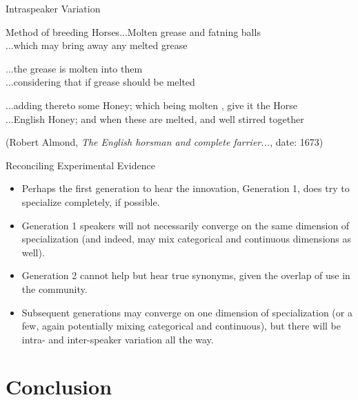 \documentclass[hyperref={pdfpagelabels=false}]{beamer}
\begin{document}
\begin{frame}{Intraspeaker Variation}
		\begin{exe}
			\ex \begin{xlist} \ex Method of breeding Horses...Molten grease and fatning balls\\
			\ex ...which may bring away any melted grease\\
			\end{xlist}
			\ex \begin{xlist} \ex ...the grease is molten into them\\
			\ex ...considering that if grease should be melted\\
			\end{xlist}
			\ex \begin{xlist} \ex...adding thereto some Honey; which being molten , give it the Horse\\
			\ex ...English Honey; and when these are melted, and well stirred together\\
			\end{xlist}
		\end{exe}
		(Robert Almond, \textsl{The English horsman and complete farrier...}, date: 1673)
\end{frame}


\begin{frame}{Reconciling Experimental Evidence}
		\begin{itemize}
			\item Perhaps the first generation to hear the innovation, Generation 1, does try to specialize completely, if possible.
			\item Generation 1 speakers will not necessarily converge on the same dimension of specialization (and indeed, may mix categorical and continuous dimensions as well).
			\item Generation 2 cannot help but hear true synonyms, given the overlap of use in the community.
			\item Subsequent generations may converge on one dimension of specialization (or a few, again potentially mixing categorical and continuous), but there will be intra- and inter-speaker variation all the way.
		\end{itemize}
\end{frame}




\section{Conclusion}
\end{document}
